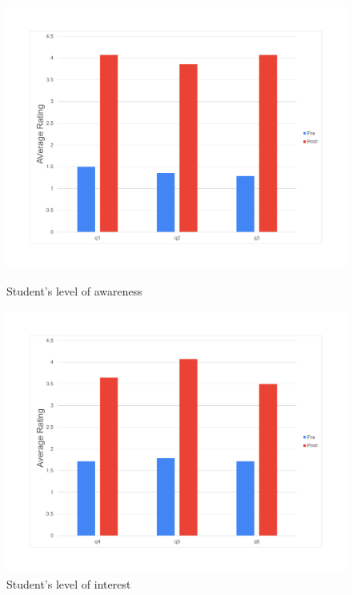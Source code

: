 \documentclass{article}
\begin{document}
\begin{figure}[!tbp]
\begin{minipage}[t]{0.45\textwidth}
\centering
\includegraphics[width=\textwidth]{9014_7.pdf}
\caption{Student's level of awareness}\label{average charts/level of awareness pre and post.pdf}
\end{minipage}
\begin{minipage}[t]{0.45\textwidth}
\centering
\includegraphics[width=\textwidth]{9014_8.pdf}
\caption{Student's level of interest} \label{average charts/level of interest pre and post.pdf}
\end{minipage}
\end{figure}
\end{document}
